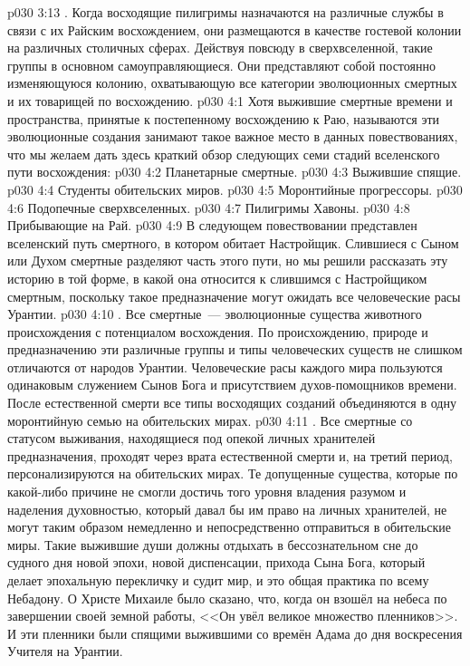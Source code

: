 \vs p030 3:13 . Когда восходящие пилигримы назначаются на различные службы в связи с их Райским восхождением, они размещаются в качестве гостевой колонии на различных столичных сферах. Действуя повсюду в сверхвселенной, такие группы в основном самоуправляющиеся. Они представляют собой постоянно изменяющуюся колонию, охватывающую все категории эволюционных смертных и их товарищей по восхождению.
\vs p030 4:1 Хотя выжившие смертные времени и пространства, принятые к постепенному восхождению к Раю, называются  эти эволюционные создания занимают такое важное место в данных повествованиях, что мы желаем дать здесь краткий обзор следующих семи стадий вселенского пути восхождения:
\vs p030 4:2 Планетарные смертные.
\vs p030 4:3 Выжившие спящие.
\vs p030 4:4 Студенты обительских миров.
\vs p030 4:5 Моронтийные прогрессоры.
\vs p030 4:6 Подопечные сверхвселенных.
\vs p030 4:7 Пилигримы Хавоны.
\vs p030 4:8 Прибывающие на Рай.
\vs p030 4:9 \pc В следующем повествовании представлен вселенский путь смертного, в котором обитает Настройщик. Слившиеся с Сыном или Духом смертные разделяют часть этого пути, но мы решили рассказать эту историю в той форме, в какой она относится к слившимся с Настройщиком смертным, поскольку такое предназначение могут ожидать все человеческие расы Урантии.
\vs p030 4:10 . Все смертные~--- эволюционные существа животного происхождения с потенциалом восхождения. По происхождению, природе и предназначению эти различные группы и типы человеческих существ не слишком отличаются от народов Урантии. Человеческие расы каждого мира пользуются одинаковым служением Сынов Бога и присутствием духов\hyp{}помощников времени. После естественной смерти все типы восходящих созданий объединяются в одну моронтийную семью на обительских мирах.
\vs p030 4:11 . Все смертные со статусом выживания, находящиеся под опекой личных хранителей предназначения, проходят через врата естественной смерти и, на третий период, персонализируются на обительских мирах. Те допущенные существа, которые по какой\hyp{}либо причине не смогли достичь того уровня владения разумом и наделения духовностью, который давал бы им право на личных хранителей, не могут таким образом немедленно и непосредственно отправиться в обительские миры. Такие выжившие души должны отдыхать в бессознательном сне до судного дня новой эпохи, новой диспенсации, прихода Сына Бога, который делает эпохальную перекличку и судит мир, и это общая практика по всему Небадону. О Христе Михаиле было сказано, что, когда он взошёл на небеса по завершении своей земной работы, <<Он увёл великое множество пленников>>. И эти пленники были спящими выжившими со времён Адама до дня воскресения Учителя на Урантии.
